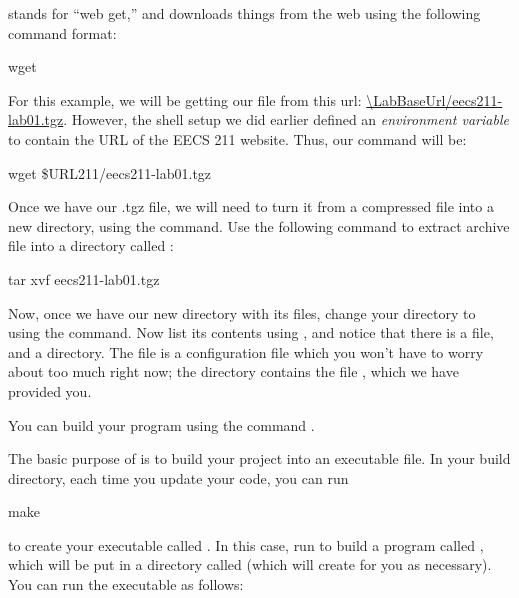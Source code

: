 \documentclass{tufte-handout}
\def\ThisLabBase{eecs211-lab01}
\def\ThisLabUrl{\LabBaseUrl/\ThisLabBase.tgz}
\begin{document}
 stands for ``web get,'' and downloads things from the web using the
following command format:

\begin{CmdLine}
  \prompt wget 
\end{CmdLine}

\noindent
For this example, we will be getting our file from this url:
\url{\ThisLabUrl}. However, the shell setup we did earlier defined
an \emph{environment variable} to contain the URL of the EECS 211
website. Thus, our command will be:

\begin{CmdLine}
  \prompt wget \$URL211/\ThisLabBase.tgz
\end{CmdLine}

Once we have our .tgz file, we will need to turn it from a compressed
file into a new directory, using the  command. Use the
following command to extract archive file into a directory called
\filename{\ThisLabBase}:

\begin{CmdLine}
  \prompt tar xvf \ThisLabBase.tgz
\end{CmdLine}

Now, once we have our new directory with its files, change your
directory to \filename{\ThisLabBase} using the  command.
Now list its contents using , and notice that there is a
 file, and a  directory. The
 file is a  configuration file which
you won't have to worry about too much right now; the 
directory contains the file , which we have provided
you.

You can build your program using the command .

The basic purpose of  is to build your project into an
executable file. In your build directory, each time you update your
code, you can run

\begin{CmdLine}
  \prompt make 
\end{CmdLine}

\noindent to create your executable called .  In
this case, run  to build a program called
, which will be put in a directory called
 (which  will create for you as
necessary). You can run the executable as follows:
\end{document}
